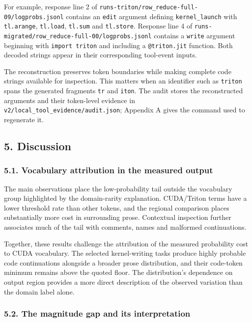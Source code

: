 \documentclass[
  11pt,
]{article}
\begin{document}
For example, response line 2 of
\texttt{runs-triton/row\_reduce-full-09/logprobs.jsonl} contains an
\texttt{edit} argument defining \texttt{kernel\_launch} with
\texttt{tl.arange}, \texttt{tl.load}, \texttt{tl.sum} and
\texttt{tl.store}. Response line 4 of
\texttt{runs-migrated/row\_reduce-full-00/logprobs.jsonl} contains a
\texttt{write} argument beginning with \texttt{import\ triton} and
including a \texttt{@triton.jit} function. Both decoded strings appear
in their corresponding tool-event inputs.

The reconstruction preserves token boundaries while making complete code
strings available for inspection. This matters when an identifier such
as \texttt{triton} spans the generated fragments \texttt{tr} and
\texttt{iton}. The audit stores the reconstructed arguments and their
token-level evidence in \texttt{v2/local\_tool\_evidence/audit.json};
Appendix A gives the command used to regenerate it.

\hypertarget{discussion}{%
\subsection{5. Discussion}\label{discussion}}

\hypertarget{status-of-the-second-link}{%
\subsubsection{5.1. Vocabulary attribution in the measured
output}\label{status-of-the-second-link}}

The main observations place the low-probability tail outside the
vocabulary group highlighted by the domain-rarity explanation.
CUDA/Triton terms have a lower threshold rate than other tokens, and the
regional comparison places substantially more cost in surrounding prose.
Contextual inspection further associates much of the tail with comments,
names and malformed continuations.

Together, these results challenge the attribution of the measured
probability cost to CUDA vocabulary. The selected kernel-writing tasks
produce highly probable code continuations alongside a broader prose
distribution, and their code-token minimum remains above the quoted
floor. The distribution's dependence on output region provides a more
direct description of the observed variation than the domain label
alone.

\hypertarget{the-magnitude-gap-and-its-interpretation}{%
\subsubsection{5.2. The magnitude gap and its
interpretation}\label{the-magnitude-gap-and-its-interpretation}}
\end{document}
